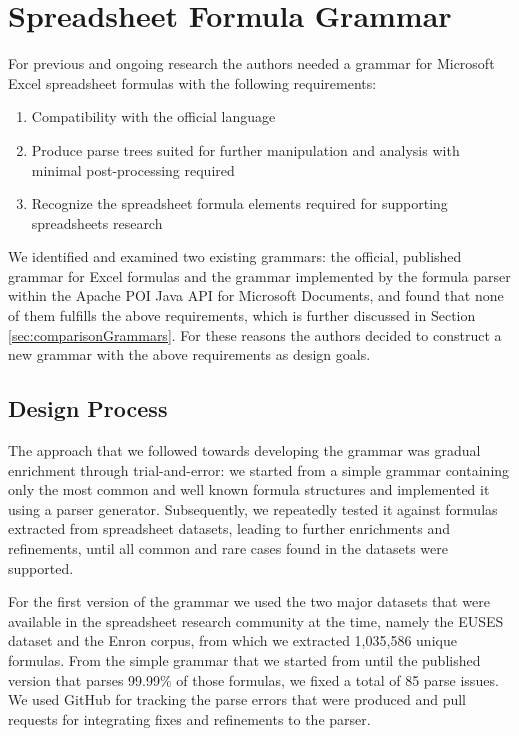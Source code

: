 \documentclass[times]{smrauth}
\begin{document}
\section{Spreadsheet Formula Grammar}
\label{section:grammar}

For previous and ongoing research the authors needed a grammar for Microsoft Excel spreadsheet formulas with the following requirements:

\label{sec:designgoals}
\begin{enumerate}
	\item Compatibility with the official language
	\item Produce parse trees suited for further manipulation and analysis with minimal post-processing required
	\item Recognize the spreadsheet formula elements required for supporting spreadsheets research
\end{enumerate}

We identified and examined two existing grammars: the official, published grammar for Excel formulas \cite{ExcelOfficialGrammar} and the grammar implemented by the formula parser within the Apache POI Java API for Microsoft Documents, and found that none of them fulfills the above requirements, which is further discussed in Section \ref{sec:comparisonGrammars}. For these reasons the authors decided to construct a new grammar with the above requirements as design goals.

\subsection{Design Process}
\label{sec:designProcess}
The approach that we followed towards developing the grammar was gradual enrichment through trial-and-error: we started from a simple grammar containing only the most common and well known formula structures and implemented it using a parser generator. Subsequently, we repeatedly tested it against formulas extracted from spreadsheet datasets, leading to further enrichments and refinements, until all common and rare cases found in the datasets were supported. 

For the first version of the grammar \cite{XLparser} we used the two major datasets that were available in the spreadsheet research community at the time, namely the EUSES dataset \cite{euses} and the Enron \cite{enron} corpus, from which we extracted 1,035,586 unique formulas. From the simple grammar that we started from until the published version that parses 99.99\% of those formulas, we fixed a total of 85 parse issues. We used GitHub for tracking the parse errors that were produced and pull requests for integrating fixes and refinements to the parser.
\end{document}
